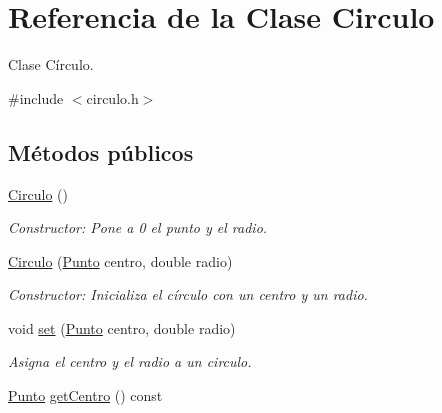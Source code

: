 \hypertarget{classCirculo}{}\section{Referencia de la Clase Circulo}
\label{classCirculo}


Clase Círculo.  




{\ttfamily \#include $<$circulo.\+h$>$}

\subsection*{Métodos públicos}
\begin{DoxyCompactItemize}
\item 
\hyperlink{classCirculo_a6933bf908b78a4167684081a3a8f257f}{Circulo} ()\hypertarget{classCirculo_a6933bf908b78a4167684081a3a8f257f}{}\label{classCirculo_a6933bf908b78a4167684081a3a8f257f}

\begin{DoxyCompactList}\small\item\em Constructor\+: Pone a 0 el punto y el radio. \end{DoxyCompactList}\item 
\hyperlink{classCirculo_ad4c6c76f0227c25afcb872a8744ebe56}{Circulo} (\hyperlink{classPunto}{Punto} centro, double radio)\hypertarget{classCirculo_ad4c6c76f0227c25afcb872a8744ebe56}{}\label{classCirculo_ad4c6c76f0227c25afcb872a8744ebe56}

\begin{DoxyCompactList}\small\item\em Constructor\+: Inicializa el círculo con un centro y un radio. \end{DoxyCompactList}\item 
void \hyperlink{classCirculo_aa24cc4b316a3d9ece35f120d9b8e1fc4}{set} (\hyperlink{classPunto}{Punto} centro, double radio)\hypertarget{classCirculo_aa24cc4b316a3d9ece35f120d9b8e1fc4}{}\label{classCirculo_aa24cc4b316a3d9ece35f120d9b8e1fc4}

\begin{DoxyCompactList}\small\item\em Asigna el centro y el radio a un circulo. \end{DoxyCompactList}\item 
\hyperlink{classPunto}{Punto} \hyperlink{classCirculo_a022cde4d10d14a47a3b3921f80909f3b}{get\+Centro} () const \hypertarget{classCirculo_a022cde4d10d14a47a3b3921f80909f3b}{}\label{classCirculo_a022cde4d10d14a47a3b3921f80909f3b}


\end{DoxyCompactItemize}
